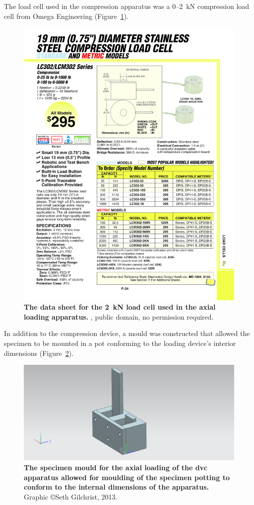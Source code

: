 The load cell used in the compression apparatus was a 0--2~kN compression load cell from Omega Engineering (Figure~\ref{fig:LCM302}).

\begin{figure}
\centering
\includegraphics[width=\linewidth]{./appendixDvc/figures/LCM302}
\caption[Load cell for axial loading apparatus]{\textbf{The data sheet for the 2~kN load cell used in the axial loading apparatus.} \cite{omega_engineering_19mm_2013}, public domain, no permission required.}
\label{fig:LCM302}
\end{figure}

In addition to the compression device, a mould was constructed that allowed the specimen to be mounted in a pot conforming to the loading device's interior dimensions (Figure~\ref{fig:MoldAssm}).

\begin{figure}[H]
\centering
\includegraphics[width=0.7\linewidth]{./appendixDvc/figures/MoldAssm}
\caption[\acs*{dvc} axial loading specimen mould]{\textbf{The specimen mould for the axial loading of the \acs*{dvc} apparatus allowed for moulding of the specimen potting to conform to the internal dimensions of the apparatus.} Graphic \copyright Seth Gilchrist, 2013.}
\label{fig:MoldAssm}
\end{figure}


